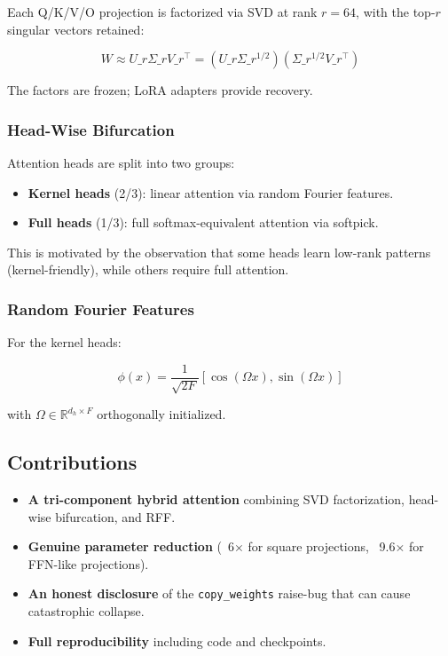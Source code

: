 Each Q/K/V/O projection is factorized via SVD at rank $r = 64$, with 
the top-$r$ singular vectors retained:

\[
W \approx U\_r \Sigma\_r V\_r^\top = (U\_r \Sigma\_r^{1/2})(\Sigma\_r^{1/2} V\_r^\top)
\]

The factors are frozen; LoRA adapters provide recovery.

\subsubsection{Head-Wise Bifurcation}

Attention heads are split into two groups:

\begin{itemize}
\item \textbf{Kernel heads} (2/3): linear attention via random Fourier features.
\item \textbf{Full heads} (1/3): full softmax-equivalent attention via softpick.

\end{itemize}
This is motivated by the observation that some heads learn low-rank 
patterns (kernel-friendly), while others require full attention.

\subsubsection{Random Fourier Features}

For the kernel heads:

\[
\phi(x) = \frac{1}{\sqrt{2F}} [\cos(\Omega x), \sin(\Omega x)]
\]

with $\Omega \in \mathbb{R}^{d_h \times F}$ orthogonally initialized.

\subsection{Contributions}

\begin{itemize}
\item \textbf{A tri-component hybrid attention} combining SVD factorization,
  head-wise bifurcation, and RFF.
\item \textbf{Genuine parameter reduction} (~6$\times$ for square projections, ~9.6$\times$ for
  FFN-like projections).
\item \textbf{An honest disclosure} of the \texttt{copy\_weights} raise-bug that can cause
  catastrophic collapse.
\item \textbf{Full reproducibility} including code and checkpoints.

\end{itemize}
